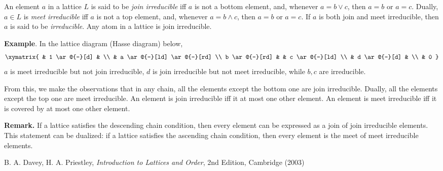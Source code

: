 \documentclass[12pt]{article}
\begin{document}
An element $a$ in a lattice $L$ is said to be \emph{join irreducible} iff $a$ is not a bottom element, and, whenever $a=b\vee c$, then $a=b$ or $a=c$.  Dually, $a\in L$ is \emph{meet irreducible} iff $a$ is not a top element, and, whenever $a=b\wedge c$, then $a=b$ or $a=c$.  If $a$ is both join and meet irreducible, then $a$ is said to be \emph{irreducible}. Any atom in a lattice is join irreducible.

\textbf{Example}.  In the lattice diagram (Hasse diagram) below,
$$
\xymatrix{
& 1 \ar@{-}[d] & \\
& a \ar@{-}[ld] \ar@{-}[rd] \\
b \ar@{-}[rd] & & c \ar@{-}[ld] \\
& d \ar@{-}[d] & \\
& 0 
}
$$
$a$ is meet irreducible but not join irreducible, $d$ is join irreducible but not meet irreducible, while $b,c$ are irreducible.

From this, we make the observations that in any chain, all the elements except the bottom one are join irreducible.  Dually, all the elements except the top one are meet irreducible.  An element is join irreducible iff it  at most one other element.  An element is meet irreducible iff it is covered by at most one other element.

\textbf{Remark.}  If a lattice satisfies the descending chain condition, then every element can be expressed as a join of join irreducible elements.  This statement can be dualized: if a lattice satisfies the ascending chain condition, then every element is the meet of meet irreducible elements.

\begin{thebibliography}{6}
 B. A. Davey, H. A. Priestley, {\it Introduction to Lattices and Order}, 2nd Edition, Cambridge (2003)
\end{thebibliography}
\end{document}
